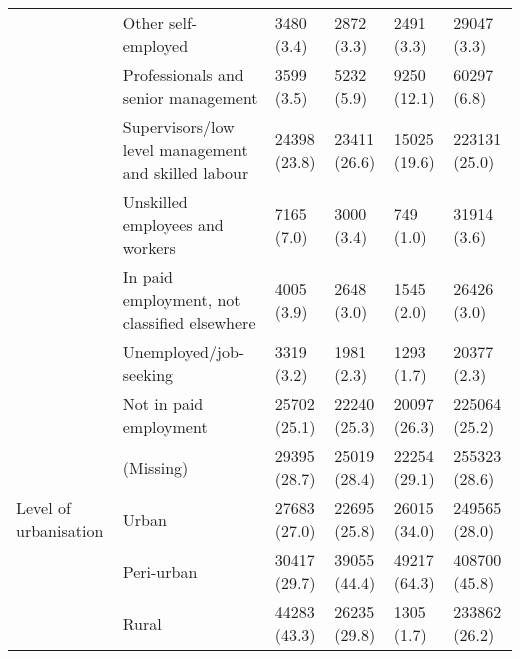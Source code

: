 \begin{tabular}{llllll}
 & Other self-employed & 3480 (3.4) & 2872 (3.3) & 2491 (3.3) & 29047 (3.3)\\
 & Professionals and senior management & 3599 (3.5) & 5232 (5.9) & 9250 (12.1) & 60297 (6.8)\\
 & Supervisors/low level management and skilled labour & 24398 (23.8) & 23411 (26.6) & 15025 (19.6) & 223131 (25.0)\\
 & Unskilled employees and workers & 7165 (7.0) & 3000 (3.4) & 749 (1.0) & 31914 (3.6)\\
 & In paid employment, not classified elsewhere & 4005 (3.9) & 2648 (3.0) & 1545 (2.0) & 26426 (3.0)\\
 & Unemployed/job-seeking & 3319 (3.2) & 1981 (2.3) & 1293 (1.7) & 20377 (2.3)\\
 & Not in paid employment & 25702 (25.1) & 22240 (25.3) & 20097 (26.3) & 225064 (25.2)\\
 & (Missing) & 29395 (28.7) & 25019 (28.4) & 22254 (29.1) & 255323 (28.6)\\
\addlinespace
Level of urbanisation & Urban & 27683 (27.0) & 22695 (25.8) & 26015 (34.0) & 249565 (28.0)\\
 & Peri-urban & 30417 (29.7) & 39055 (44.4) & 49217 (64.3) & 408700 (45.8)\\
 & Rural & 44283 (43.3) & 26235 (29.8) & 1305 (1.7) & 233862 (26.2)\\
\bottomrule
\end{tabular}